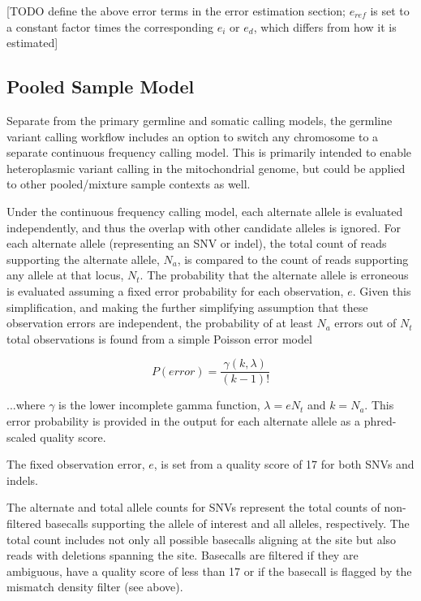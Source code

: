 \documentclass{article}
\begin{document}
[TODO define the above error terms in the error estimation section; $e_{ref}$ is set to a constant factor times the corresponding $e_i$ or $e_d$, which differs from how it is estimated]


\subsection{Pooled Sample Model}

Separate from the primary germline and somatic calling models, the germline variant calling workflow includes an option to switch any chromosome to a separate continuous frequency calling model. This is primarily intended to enable heteroplasmic variant calling in the mitochondrial genome, but could be applied to other pooled/mixture sample contexts as well.

Under the continuous frequency calling model, each alternate allele is evaluated independently, and thus the overlap with other candidate alleles is ignored. For each alternate allele (representing an SNV or indel), the total count of reads supporting the alternate allele, $N_a$, is compared to the count of reads supporting any allele at that locus, $N_t$. The probability that the alternate allele is erroneous is evaluated assuming a fixed error probability for each observation, $e$. Given this simplification, and making the further simplifying assumption that these observation errors are independent, the probability of at least $N_a$ errors out of $N_t$ total observations is found from a simple Poisson error model

\begin{equation*}
P(error) = \frac{\gamma(k,\lambda)}{(k-1)!}
\end{equation*}

...where $\gamma$ is the lower incomplete gamma function, $\lambda = e N_t$ and $k = N_a$. This error probability is provided in the output for each alternate allele as a phred-scaled quality score.

The fixed observation error, $e$, is set from a quality score of 17 for both SNVs and indels.

The alternate and total allele counts for SNVs represent the total counts of non-filtered basecalls supporting the allele of interest and all alleles, respectively. The total count includes not only all possible basecalls aligning at the site but also reads with deletions spanning the site. Basecalls are filtered if they are ambiguous, have a quality score of less than 17 or if the basecall is flagged by the mismatch density filter (see above).
\end{document}

